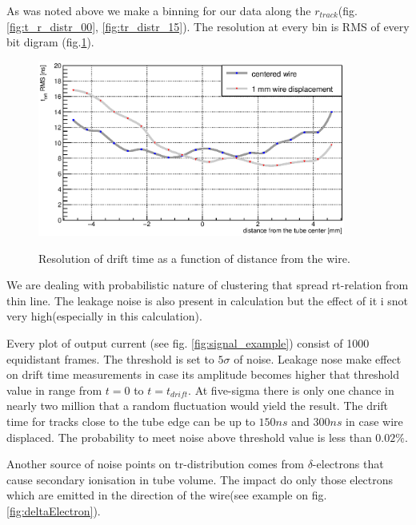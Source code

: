 \documentclass[]{article}
\begin{document}
	As was noted above we make a binning  for our data along the $r_{track}$(fig. \ref{fig:t_r_distr_00}, \ref{fig:tr_distr_15}). The resolution at every bin  is RMS of every bit digram (fig.\ref{fig:driftTimeResolutionEvo}).

	
	\begin{figure}[h!]
		\centering
		\includegraphics[width=0.9\textwidth]{DTimeRMS2}
		\label{fig:driftTimeResolutionEvo}
		\caption{Resolution of drift time as a function of distance from the wire.}
	\end{figure}
	
	We are dealing with probabilistic  nature of clustering that spread rt-relation from thin line. The leakage noise is also present in calculation but the effect of it i snot very high(especially in this calculation).
	
	Every plot of output current (see fig. \ref{fig:signal_example}) consist of 1000 equidistant frames. The threshold is set to $5\sigma$ of noise. Leakage nose make effect on drift time measurements in case its amplitude becomes higher that threshold value in range from $t=0$ to $t= t_{drift}$. At five-sigma there is only one chance in nearly two million that a random fluctuation would yield the result. The drift time for tracks close to the tube edge can be up to $150 ns$ and $300 ns$ in case wire displaced. The probability to meet noise above threshold value is less than $0.02\%$.
	
	Another source of noise points on tr-distribution comes from $\delta$-electrons that cause secondary ionisation in tube volume. The impact do only those electrons which are emitted in the direction of the wire(see example on fig.\ref{fig:deltaElectron}).
	
\end{document}
